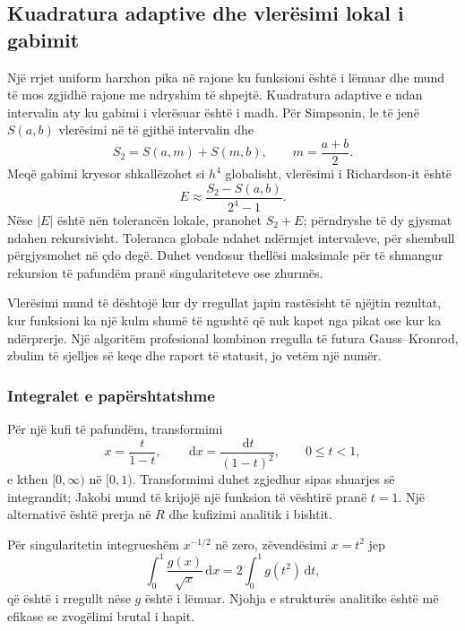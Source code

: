\documentclass[11pt,oneside,openany]{book}
\newcommand{\dd}{\,\mathrm{d}}
\begin{document}
\subsection{Kuadratura adaptive dhe vlerësimi lokal i gabimit}
Një rrjet uniform harxhon pika në rajone ku funksioni është i lëmuar dhe mund të mos zgjidhë rajone me ndryshim të shpejtë. Kuadratura adaptive e ndan intervalin aty ku gabimi i vlerësuar është i madh. Për Simpsonin, le të jenë $S(a,b)$ vlerësimi në të gjithë intervalin dhe
\begin{equation}
 S_2=S(a,m)+S(m,b),\qquad m=\frac{a+b}{2}.
\end{equation}
Meqë gabimi kryesor shkallëzohet si $h^4$ globalisht, vlerësimi i Richardson-it është
\begin{equation}
 E\approx\frac{S_2-S(a,b)}{2^4-1}.
\end{equation}
Nëse $|E|$ është nën tolerancën lokale, pranohet $S_2+E$; përndryshe të dy gjysmat ndahen rekursivisht. Toleranca globale ndahet ndërmjet intervaleve, për shembull përgjysmohet në çdo degë. Duhet vendosur thellësi maksimale për të shmangur rekursion të pafundëm pranë singulariteteve ose zhurmës.

Vlerësimi mund të dështojë kur dy rregullat japin rastësisht të njëjtin rezultat, kur funksioni ka një kulm shumë të ngushtë që nuk kapet nga pikat ose kur ka ndërprerje. Një algoritëm profesional kombinon rregulla të futura Gauss--Kronrod, zbulim të sjelljes së keqe dhe raport të statusit, jo vetëm një numër.

\subsubsection{Integralet e papërshtatshme}
Për një kufi të pafundëm, transformimi
\begin{equation}
 x=\frac{t}{1-t},\qquad \dd x=\frac{\dd t}{(1-t)^2},\qquad 0\le t<1,
\end{equation}
e kthen $[0,\infty)$ në $[0,1)$. Transformimi duhet zgjedhur sipas shuarjes së integrandit; Jakobi mund të krijojë një funksion të vështirë pranë $t=1$. Një alternativë është prerja në $R$ dhe kufizimi analitik i bishtit.

Për singularitetin integrueshëm $x^{-1/2}$ në zero, zëvendësimi $x=t^2$ jep
\begin{equation}
 \int_0^1\frac{g(x)}{\sqrt x}\dd x
 =2\int_0^1g(t^2)\dd t,
\end{equation}
që është i rregullt nëse $g$ është i lëmuar. Njohja e strukturës analitike është më efikase se zvogëlimi brutal i hapit.
\end{document}
